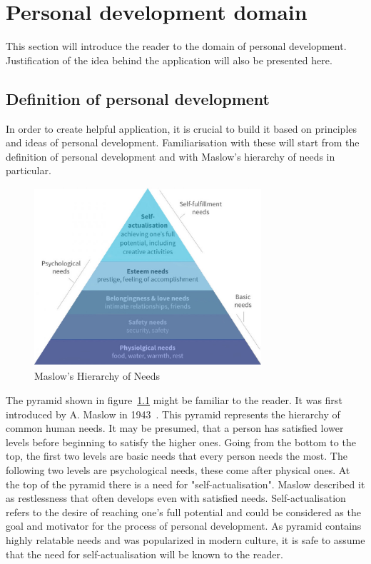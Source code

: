 

\chapter{Personal development domain}\label{ch:personal-development-domain}


This section will introduce the reader to the domain of personal development.
Justification of the idea behind the application will also be presented here.



\section{Definition of personal development}\label{sec:definition-of-personal-development}

In order to create helpful application, it is crucial to build it based on principles and ideas of personal development.
Familiarisation with these will start from the definition of personal development and with Maslow's hierarchy of needs in particular.

\begin{figure}[h]
    \includegraphics[width=0.75\textwidth]{images/maslows.jpg}
    \caption{Maslow's Hierarchy of Needs~\cite{maslow-pyramid}}
    \label{fig:maslow-pyramid}
\end{figure}

The pyramid shown in figure~\ref{fig:maslow-pyramid} might be familiar to the reader.
It was first introduced by A. Maslow in 1943~\cite{maslow-motivation}.
This pyramid represents the hierarchy of common human needs.
It may be presumed, that a person has satisfied lower levels before beginning to satisfy the higher ones.
Going from the bottom to the top, the first two levels are basic needs that every person needs the most.
The following two levels are psychological needs, these come after physical ones.
At the top of the pyramid there is a need for "self-actualisation".
Maslow described it as restlessness that often develops even with satisfied needs.
Self-actualisation refers to the desire of reaching one's full potential and could be considered as the goal and motivator for the process of personal development.
As pyramid contains highly relatable needs and was popularized in modern culture, it is safe to assume that the need for self-actualisation will be known to the reader.


